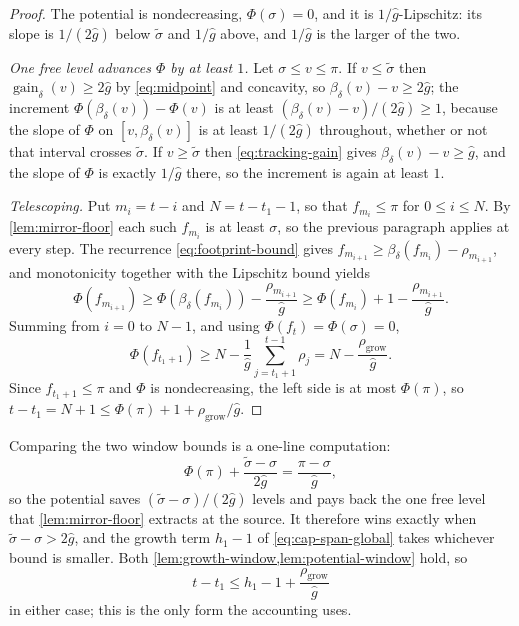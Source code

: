 \documentclass[11pt]{article}
\theoremstyle{plain}
\theoremstyle{remark}
\newcommand{\gaind}{\operatorname{gain}_{\delta}}
\newcommand{\ghat}{\widehat g}
\newcommand{\sigmatilde}{\widetilde{\sigma}}
\newcommand{\Pot}{\Phi}
\newcommand{\spend}[2]{\sum_{j=#1}^{#2}\rho_j}
\begin{document}
\begin{proof}
The potential is nondecreasing, \(\Pot(\sigma)=0\), and it is
\(1/\ghat\)-Lipschitz: its slope is \(1/(2\ghat)\) below \(\sigmatilde\) and \(1/\ghat\)
above, and \(1/\ghat\) is the larger of the two.

\emph{One free level advances \(\Pot\) by at least \(1\).}  Let
\(\sigma\le v\le\pi\).  If \(v\le\sigmatilde\) then \(\gaind(v)\ge2\ghat\) by
\eqref{eq:midpoint} and concavity, so
\(\beta_\delta(v)-v\ge2\ghat\); the increment
\(\Pot(\beta_\delta(v))-\Pot(v)\) is at least
\((\beta_\delta(v)-v)/(2\ghat)\ge1\), because the slope of \(\Pot\) on
\([v,\beta_\delta(v)]\) is at least \(1/(2\ghat)\) throughout, whether or not that
interval crosses \(\sigmatilde\).  If \(v\ge\sigmatilde\) then \eqref{eq:tracking-gain} gives
\(\beta_\delta(v)-v\ge\ghat\), and the slope of \(\Pot\) is exactly
\(1/\ghat\) there, so the increment is again at least \(1\).

\emph{Telescoping.}  Put \(m_i=t-i\) and \(N=t-t_1-1\), so that
\(f_{m_i}\le\pi\) for \(0\le i\le N\).  By \cref{lem:mirror-floor} each such
\(f_{m_i}\) is at least \(\sigma\), so the previous paragraph applies at every step.
The recurrence \eqref{eq:footprint-bound} gives
\(f_{m_{i+1}}\ge\beta_\delta(f_{m_i})-\rho_{m_{i+1}}\), and monotonicity together
with the Lipschitz bound yields
\[
 \Pot(f_{m_{i+1}})\ge\Pot(\beta_\delta(f_{m_i}))-\frac{\rho_{m_{i+1}}}{\ghat}
 \ge\Pot(f_{m_i})+1-\frac{\rho_{m_{i+1}}}{\ghat} .
\]
Summing from \(i=0\) to \(N-1\), and using \(\Pot(f_t)=\Pot(\sigma)=0\),
\[
 \Pot(f_{t_1+1})\ge N-\frac{1}{\ghat}\spend{t_1+1}{t-1}
 =N-\frac{\rho_{\mathrm{grow}}}{\ghat} .
\]
Since \(f_{t_1+1}\le\pi\) and \(\Pot\) is nondecreasing, the left side is at most
\(\Pot(\pi)\), so
\(t-t_1=N+1\le\Pot(\pi)+1+\rho_{\mathrm{grow}}/\ghat\).
\end{proof}

Comparing the two window bounds is a one-line computation:
\begin{equation}
 \Pot(\pi)+\frac{\sigmatilde-\sigma}{2\ghat}=\frac{\pi-\sigma}{\ghat},
 \label{eq:potential-gap}
\end{equation}
so the potential saves \((\sigmatilde-\sigma)/(2\ghat)\) levels and pays back the one free level
that \cref{lem:mirror-floor} extracts at the source.  It therefore wins exactly when
\(\sigmatilde-\sigma>2\ghat\), and the growth term \(h_1-1\) of \eqref{eq:cap-span-global}
takes whichever bound is smaller.  Both \cref{lem:growth-window,lem:potential-window}
hold, so
\begin{equation}
 t-t_1\le h_1-1+\frac{\rho_{\mathrm{grow}}}{\ghat}
 \label{eq:growth-constant-window}
\end{equation}
in either case; this is the only form the accounting uses.
\end{document}
